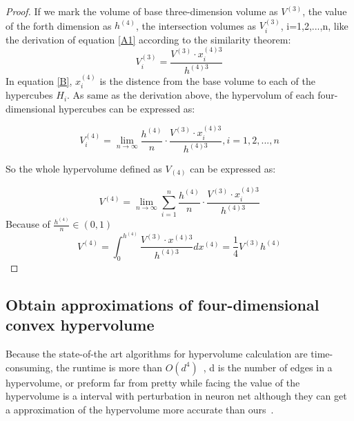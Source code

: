 \documentclass[runningheads]{llncs}
\begin{document}
\begin{proof}
If we mark the volume of base three-dimension volume as $V^{(3)}$, the value of the forth dimension as $h^{(4)}$, the intersection volumes as  $V_{i}^{(3)}$, i=1,2,...,n, like the derivation of equation \ref{A1} according to the similarity theorem:
\begin{equation}\label{B}
V_{i}^{(3)}=\frac{V^{(3)}\cdot x_{i}^{(4) 3}}{h^{(4) 3}} 
\end{equation} 
In equation \ref{B}, $x_{i}^{(4)}$ is the distence from the base volume to each of the hypercubes $H_{i}$. As same as the derivation above, the hypervolum of each four-dimensional hypercubes can be expressed as:

\begin{equation}\label{B1}
V_{i}^{(4)}=\lim \limits_{n \to \infty}\frac{h^{(4)}}{n}\cdot \frac{V^{(3)}\cdot x_{i}^{(4) 3}}{h^{(4)3}}, i=1,2,...,n
\end{equation}

So the whole hypervolume defined as $V_{(4)}$ can be expressed as:

\begin{equation}\label{B2}
V^{(4)}=\lim \limits_{n \to \infty}\sum_{i=1}^{n}\frac{h^{(4)}}{n}\cdot \frac{V^{(3)}\cdot x_{i}^{(4) 3}}{h^{(4) 3}}
\end{equation}
Because of $\frac{h^{(4)}}{n}\in \left ( 0,1\right )$
\begin{equation}\label{B3}
V^{(4)}=\int_{0}^{h^{(4)}}\frac{V^{(3)}\cdot x^{(4) 3}}{h^{(4) 3}}dx^{(4)} = \frac{1}{4}V^{(3)}h^{(4)}
\end{equation}

\end{proof}


\subsection{Obtain approximations of four-dimensional convex hypervolume}

Because the state-of-the art algorithms for hypervolume calculation are time-consuming, the runtime is more than $O(d^{4})$~\cite{ref_article2}, d is the number of edges in a hypervolume, or preform far from pretty while facing the value of the hypervolume is a interval with perturbation in neuron net although they can get a approximation of the hypervolume more accurate than ours~\cite{ref_article3}. 
\end{document}
